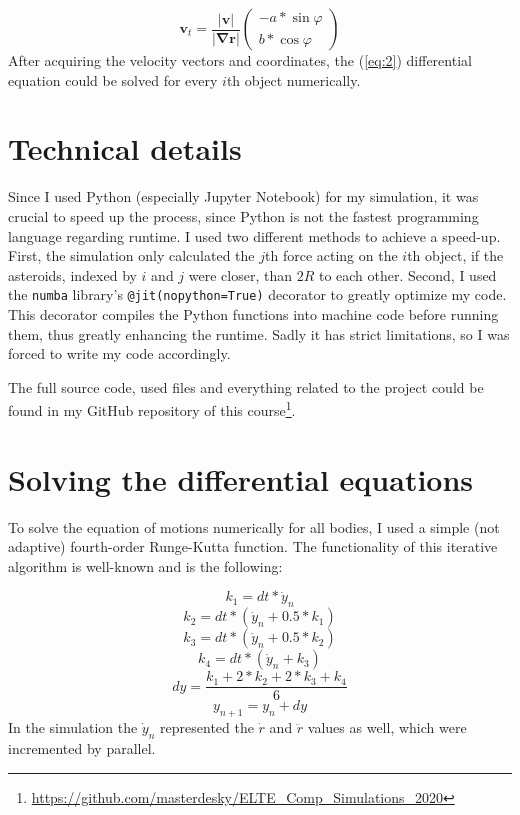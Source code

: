 \begin{multicols}{2}
\begin{equation} \label{eq:10}
\boldsymbol{v}_{t}
=
\frac{\left| \boldsymbol{v} \right|}{\left| \boldsymbol{\nabla} \boldsymbol{r} \right|}
\begin{pmatrix}
-a * \sin{\varphi} \\
b * \cos{\varphi}
\end{pmatrix}
\end{equation}
After acquiring the velocity vectors and coordinates, the (\ref{eq:2}) differential equation could be solved for every $i$th object numerically.

\section{Technical details}
Since I used Python (especially Jupyter Notebook) for my simulation, it was crucial to speed up the process, since Python is not the fastest programming language regarding runtime. I used two different methods to achieve a speed-up. First, the simulation only calculated the $j$th force acting on the $i$th object, if the asteroids, indexed by $i$ and $j$ were closer, than $2R$ to each other. Second, I used the \texttt{numba} library's \texttt{@jit(nopython=True)} decorator to greatly optimize my code. This decorator compiles the Python functions into machine code before running them, thus greatly enhancing the runtime. Sadly it has strict limitations, so I was forced to write my code accordingly. \par
The full source code, used files and everything related to the project could be found in my GitHub repository of this course\footnote{\url{https://github.com/masterdesky/ELTE\_Comp\_Simulations\_2020}}.

\section{Solving the differential equations}
To solve the equation of motions numerically for all bodies, I used a simple (not adaptive) fourth-order Runge-Kutta function. The functionality of this iterative algorithm is well-known and is the following:

\begin{equation}
k_{1} = dt * \dot{y}_{n}
\end{equation}
\begin{equation}
k_{2} = dt * \left( \dot{y}_{n} + 0.5 * k_1 \right)
\end{equation}
\begin{equation}
k_{3} = dt * \left( \dot{y}_{n} + 0.5 * k_2 \right)
\end{equation}
\begin{equation}
k_{4} = dt * \left( \dot{y}_{n} + k_3 \right)
\end{equation}
\begin{equation}
dy = \frac{k_{1} + 2 * k_{2} + 2 * k_{3} + k_{4}}{6}
\end{equation}
\begin{equation}
y_{n+1} = y_{n} + dy
\end{equation}
In the simulation the $\dot{y}_{n}$ represented the $\dot{r}$ and $\ddot{r}$ values as well, which were incremented by parallel.


\end{multicols}
